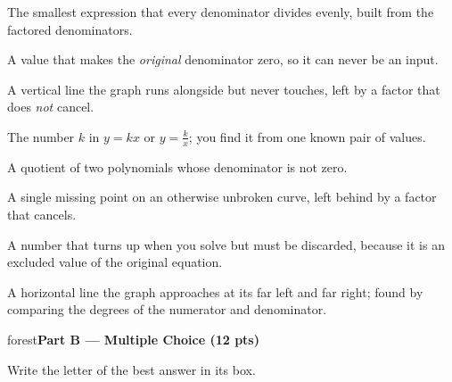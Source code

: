 \documentclass[10pt]{article}
\newcommand{\parthead}[1]{%
  \vspace{6pt}\noindent
  \begin{headlinebox}{forest}\color{white}\bfseries #1\end{headlinebox}%
  \vspace{4pt}}
\begin{document}
\begin{minipage}[t]{0.57\textwidth}
\small
\begin{description}[leftmargin=1.4em, itemsep=3pt]
  \item[(A)] The smallest expression that every denominator divides evenly, built from the factored denominators.
  \item[(B)] A value that makes the \emph{original} denominator zero, so it can never be an input.
  \item[(C)] A vertical line the graph runs alongside but never touches, left by a factor that does \emph{not} cancel.
  \item[(D)] The number $k$ in $y=kx$ or $y=\frac{k}{x}$; you find it from one known pair of values.
  \item[(E)] A quotient of two polynomials whose denominator is not zero.
  \item[(F)] A single missing point on an otherwise unbroken curve, left behind by a factor that cancels.
  \item[(G)] A number that turns up when you solve but must be discarded, because it is an excluded value of the original equation.
  \item[(H)] A horizontal line the graph approaches at its far left and far right; found by comparing the degrees of the numerator and denominator.
\end{description}
\end{minipage}

\parthead{Part B --- Multiple Choice (12 pts)}
Write the letter of the best answer in its box.
\end{document}

